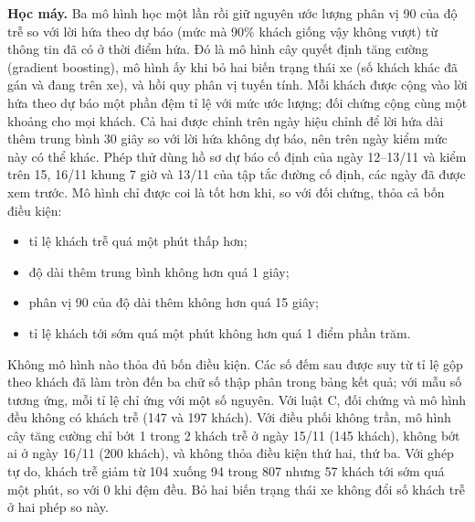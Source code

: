 \textbf{Học máy.} Ba mô hình học một lần rồi giữ nguyên ước lượng phân vị 90 của độ trễ so với lời hứa theo dự báo (mức
mà 90\% khách giống vậy không vượt) từ thông tin đã có ở thời điểm hứa. Đó là mô hình cây quyết định tăng cường
(gradient boosting), mô hình ấy khi bỏ hai biến trạng thái xe (số khách khác đã gán và đang trên xe), và hồi quy phân vị
tuyến tính. Mỗi khách được cộng vào lời hứa theo dự báo một phần đệm tỉ lệ với mức ước lượng; đối chứng cộng cùng một
khoảng cho mọi khách. Cả hai được chỉnh trên ngày hiệu chỉnh để lời hứa dài thêm trung bình 30 giây so với lời hứa không
dự báo, nên trên ngày kiểm mức này có thể khác. Phép thử dùng hồ sơ dự báo cố định của ngày
12--13/11 và kiểm trên 15, 16/11 khung 7 giờ và 13/11 của tập tắc đường cố định, các ngày đã được xem trước. Mô hình
chỉ được coi là tốt hơn khi, so với đối chứng, thỏa cả bốn điều kiện:
\begin{itemize}[leftmargin=1.2cm,itemsep=0pt,topsep=2pt]
\item tỉ lệ khách trễ quá một phút thấp hơn;
\item độ dài thêm trung bình không hơn quá 1 giây;
\item phân vị 90 của độ dài thêm không hơn quá 15 giây;
\item tỉ lệ khách tới sớm quá một phút không hơn quá 1 điểm phần trăm.
\end{itemize}

Không mô hình nào thỏa đủ bốn điều kiện. Các số đếm sau được suy từ tỉ lệ gộp theo khách đã làm tròn đến ba chữ số
thập phân trong bảng kết quả; với mẫu số tương ứng, mỗi tỉ lệ chỉ ứng với một số nguyên. Với luật C, đối chứng và mô hình đều không có khách trễ (147 và 197 khách).
Với điều phối không trần, mô hình cây tăng cường chỉ bớt 1 trong 2 khách trễ ở ngày 15/11 (145 khách), không bớt ai ở
ngày 16/11 (200 khách), và không thỏa điều kiện thứ hai, thứ ba. Với ghép tự do, khách trễ giảm từ 104 xuống 94 trong 807
nhưng 57 khách tới sớm quá một phút, so với 0 khi đệm đều. Bỏ hai biến trạng thái xe không đổi số khách trễ ở hai phép
so này.


